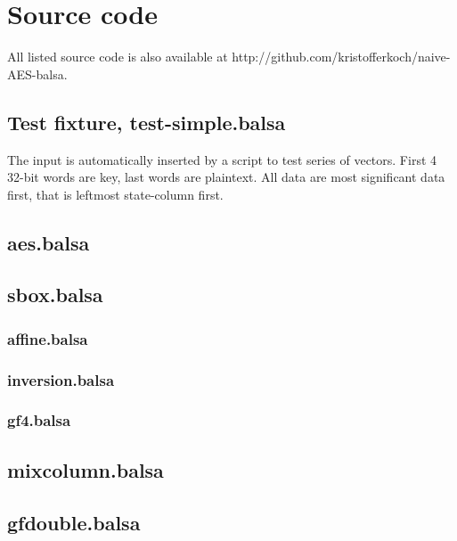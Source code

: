 \section{Source code}

All listed source code is also available at
http://github.com/kristofferkoch/naive-AES-balsa.

\subsection{Test fixture, test-simple.balsa}

The input is automatically inserted by a script to test series of
vectors. First 4 32-bit words are key, last words are plaintext. All
data are most significant data first, that is leftmost state-column
first.



\subsection{aes.balsa}


\subsection{sbox.balsa}


\subsubsection{affine.balsa}


\subsubsection{inversion.balsa}


\subsubsection{gf4.balsa}



\subsection{mixcolumn.balsa}


\subsection{gfdouble.balsa}

